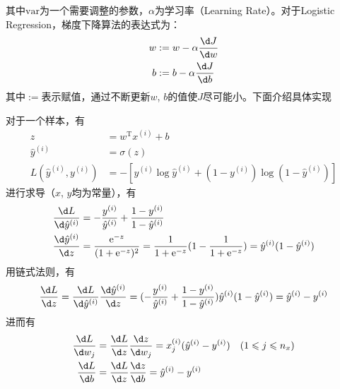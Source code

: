 其中$\mathrm{var}$为一个需要调整的参数，$\alpha$为学习率（Learning Rate）。对于Logistic Regression，梯度下降算法的表达式为：
\begin{equation}
    \begin{aligned}
    w &:= w - \alpha \frac{\d J}{\d w} \\
    b &:= b - \alpha \frac{\d J}{\d b}
    \end{aligned} 
    \label{eq:gradient_logistic}
\end{equation}
其中$:=$表示赋值，通过不断更新$w$, $b$的值使$J$尽可能小。下面介绍具体实现

对于一个样本，有
\begin{equation}
    \begin{aligned}
    z &= w^\mathrm{T} x^{(i)} + b \\
    \hat{y}^{(i)} &= \sigma(z) \\
    L(\hat{y}^{(i)}, y^{(i)}) &= -\left[y^{(i)} \log \hat{y}^{(i)} + (1 - y^{(i)}) \log (1 - \hat{y}^{(i)})\right]
    \end{aligned} 
    \label{eq:gradient_logistic_sample}
\end{equation}
进行求导（$x$, $y$均为常量），有
\begin{equation}
    \begin{aligned}
    &\frac{\d L}{\d \hat{y}^{(i)}} = -\frac{y^{(i)}}{\hat{y}^{(i)}} + \frac{1 - y^{(i)}}{1 - \hat{y}^{(i)}} \\
    &\frac{\d \hat{y}^{(i)}}{\d z} = \frac{\mathrm{e}^{-z}}{(1 + \mathrm{e}^{-z})^2} = \frac{1}{1 + \mathrm{e}^{-z}}(1 - \frac{1}{1 + \mathrm{e}^{-z}}) = \hat{y}^{(i)}(1 - \hat{y}^{(i)})\\
    \end{aligned}
\end{equation}
用链式法则，有
\begin{equation}
    \frac{\d L}{\d z} = \frac{\d L}{\d \hat{y}^{(i)}} \frac{\d \hat{y}^{(i)}}{\d z} = (-\frac{y^{(i)}}{\hat{y}^{(i)}} + \frac{1 - y^{(i)}}{1 - \hat{y}^{(i)}})\hat{y}^{(i)}(1 - \hat{y}^{(i)}) = \hat{y}^{(i)} - y^{(i)}
\end{equation}
进而有
\begin{equation}
    \begin{aligned}
    \frac{\d L}{\d w_j} &= \frac{\d L}{\d z} \frac{\d z}{\d w_j} = x_j^{(i)} (\hat{y}^{(i)} - y^{(i)}) \quad (1 \leqslant j \leqslant n_x) \\
    \frac{\d L}{\d b} &= \frac{\d L}{\d z} \frac{\d z}{\d b} = \hat{y}^{(i)} - y^{(i)}
    \end{aligned}
\end{equation}

